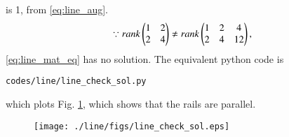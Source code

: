 \begin{enumerate}[label=\arabic*.,ref=\thesubsection.\theenumi]
is 1, from \ref{eq:line_aug}. 
%
\begin{align}
\because rank \begin{pmatrix}1 & 2\\2 & 4\end{pmatrix} \ne rank\begin{pmatrix}1 & 2 & 4\\2 & 4 & 12\end{pmatrix},  
\end{align}
%
\eqref{eq:line_mat_eq} has no solution.
%
The equivalent python code is
%
\begin{lstlisting}
codes/line/line_check_sol.py
\end{lstlisting}
%
which plots Fig. \ref{fig:line_check_sol}, which shows that the rails are parallel.
%
\begin{figure}[!ht]
\texttt{[image: ./line/figs/line\_check\_sol.eps]}
\caption{}
\label{fig:line_check_sol}
\end{figure}
%


\end{enumerate}
